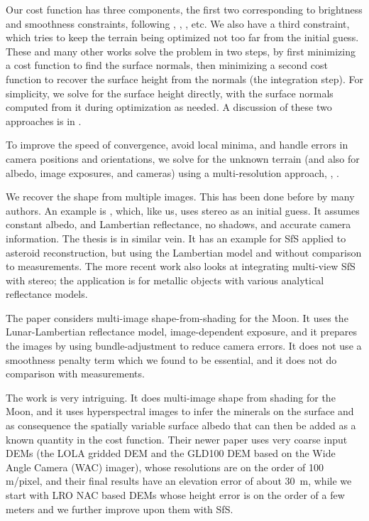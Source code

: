 \documentclass[12pt,oneside]{article}
\begin{document}
Our cost function has three components, the first two corresponding to brightness and
smoothness constraints, following \cite{ikeuchi1981numerical},
\cite{horn1990height}, \cite{lee1993shape}, etc. We also have a third constraint,
which tries to keep the terrain being optimized not too far from the initial guess. 
These and many other
works solve the problem in two steps, by first minimizing a cost
function to find the surface normals, then minimizing a second cost
function to recover the surface height from the normals (the integration
step).  For simplicity, we solve for the surface height directly, with
the surface normals computed from it during optimization as needed. A
discussion of these two approaches is in
\cite{crouzil2003multiresolution}.

To improve the speed of convergence, avoid local minima, and handle
errors in camera positions and orientations, we solve for the unknown
terrain (and also for albedo, image exposures, and cameras) using a
multi-resolution approach, \cite{terzopoulos1984efficient},
\cite{crouzil2003multiresolution}.

We recover the shape from multiple images. This has been done before by
many authors. An example is \cite{wu2011high}, which, like us, uses
stereo as an initial guess. It assumes constant albedo, and Lambertian
reflectance, no shadows, and accurate camera information.  The thesis
\cite{lux2011multi} is in similar vein. It has an example for SfS
applied to asteroid reconstruction, but using the Lambertian model and
without comparison to measurements. The more recent work
\cite{lenoch2017multi} also looks at integrating multi-view SfS with
stereo; the application is for metallic objects with various analytical
reflectance models.

The paper \citet{lohse2006derivation} considers multi-image
shape-from-shading for the Moon. It uses the Lunar-Lambertian reflectance
model, image-dependent exposure, and it prepares the images by using
bundle-adjustment to reduce camera errors. It does not use a smoothness
penalty term which we found to be essential, and it does not do comparison with
measurements.

The work \cite{grumpe2011construction} is very intriguing. It does
multi-image shape from shading for the Moon, and it uses hyperspectral
images to infer the minerals on the surface and as consequence the
spatially variable surface albedo that can then be added as a known
quantity in the cost function. Their newer paper
\cite{grumpe2014construction} uses very coarse input DEMs (the LOLA
gridded DEM and the GLD100 DEM based on the Wide Angle Camera (WAC)
imager), whose resolutions are on the order of 100 m/pixel, and their
final results have an elevation error of about 30~m, while we start with
LRO NAC based DEMs whose height error is on the order of a few meters
and we further improve upon them with SfS.
\end{document}
